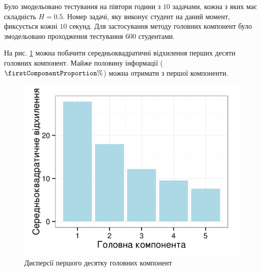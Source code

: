 Було змодельовано тестування на півтори години з $10$ задачами,
кожна з яких має складність $H=0.5$.
Номер задачі, яку виконує студент на даний момент, фиксується кожні $10$
секунд.
Для застосування методу головних компонент
було змодельовано проходження тестування $600$ студентами.

На рис. \ref{fig:pca:main} можна побачити середньоквадратичні відхилення
перших десяти головних компонент.
Майже половину інформації ($\firstComponentProportion\%$) можна отримати
з першої компоненти.
\begin{figure}[h]
  \centering
    \includegraphics{images/pca}
  \caption{Дисперсії першого десятку головних компонент}
  \label{fig:pca:main}
\end{figure}

